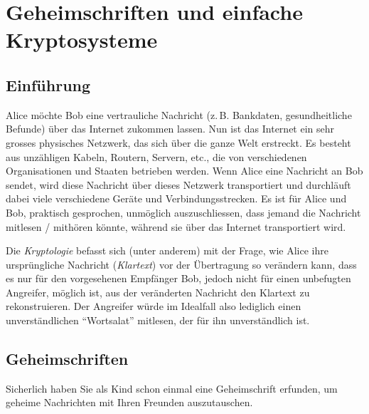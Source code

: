 \chapter{Geheimschriften und einfache Kryptosysteme}\label{ch:Geheimschriften_Kryptosysteme}

\lstset{style=Python}

\section{Einführung}\label{sec:intro}

Alice möchte Bob eine vertrauliche Nachricht (z.\,B. Bankdaten, gesundheitliche Befunde) über das Internet zukommen lassen. Nun ist das Internet ein sehr grosses physisches Netzwerk, das sich über die ganze Welt erstreckt.
Es besteht aus unzähligen Kabeln, Routern, Servern, etc., die von verschiedenen Organisationen und Staaten betrieben werden. Wenn Alice eine Nachricht an Bob sendet, wird diese Nachricht über dieses Netzwerk transportiert und durchläuft dabei viele verschiedene Geräte und Verbindungsstrecken.
Es ist für Alice und Bob, praktisch gesprochen, unmöglich auszuschliessen, dass jemand die Nachricht mitlesen / mithören könnte, während sie über das Internet transportiert wird.
\par

Die \emph{Kryptologie} befasst sich (unter anderem) mit der Frage, wie Alice ihre ursprüngliche Nachricht (\emph{Klartext}) vor der Übertragung so verändern kann, dass es nur für den vorgesehenen Empfänger Bob, jedoch nicht für einen unbefugten Angreifer, möglich ist, aus der veränderten Nachricht den Klartext zu rekonstruieren. Der Angreifer würde im Idealfall also lediglich einen unverständlichen \enquote{Wortsalat} mitlesen, der für ihn unverständlich ist.

\section{Geheimschriften}\label{sec:geheimschriften}
Sicherlich haben Sie als Kind schon einmal eine Geheimschrift erfunden, um geheime Nachrichten mit Ihren Freunden auszutauschen.

